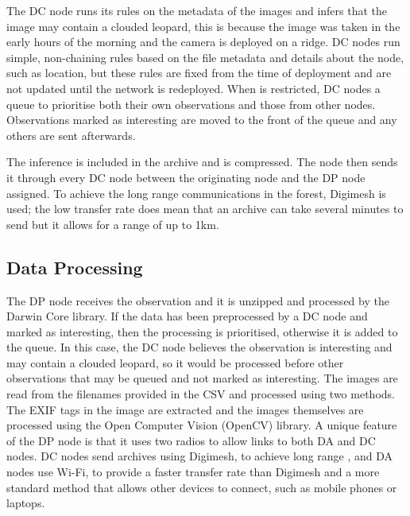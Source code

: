 			The DC node runs its rules on the metadata of the images and infers that the image may contain a clouded leopard, this is because the image was taken in the early hours of the morning and the camera is deployed on a ridge. DC nodes run simple, non-chaining rules based on the file metadata and details about the node, such as location, but these rules are fixed from the time of deployment and are not updated until the network is redeployed. When \DIFdelbegin {}\DIFdelend \DIFaddbegin {}\DIFaddend is restricted, DC nodes \DIFdelbegin {}\DIFdelend \DIFaddbegin {}\DIFaddend a queue to prioritise both their own observations and those \DIFdelbegin {}\DIFdelend \DIFaddbegin {}\DIFaddend from other nodes. Observations marked as interesting are moved to the front of the queue and any others are sent afterwards.

			The inference is included in the archive and is compressed. The node then sends it through every DC node between the originating node and the DP node assigned. To achieve the long range communications in the forest, Digimesh is used; the low transfer rate does mean that an archive can take several minutes to send but it allows for a range of up to 1km.

	\subsection{Data Processing}			
			The DP node receives the observation and it is unzipped and processed by the Darwin Core library. If the data has been preprocessed by a DC node and marked as interesting, then the processing is prioritised, otherwise it is added to the queue. In this case, the DC node believes the observation is interesting and may contain a clouded leopard, so it would be processed before other observations that may be queued and not marked as interesting. The images are read from the filenames provided in the CSV and processed using two methods. The EXIF tags in the image are extracted and the images themselves are processed using the Open Computer Vision (OpenCV) library. A unique feature of the DP node is that it uses two radios to allow links to both DA and DC nodes. DC nodes send archives using Digimesh, to achieve long range \DIFdelbegin {}\DIFdelend \DIFaddbegin {}\DIFaddend , and DA nodes use Wi-Fi, to provide a faster transfer rate than Digimesh and a more standard method that allows other devices to connect, such as mobile phones or laptops.

